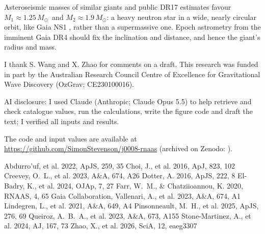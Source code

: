 \documentclass{aastex701}
\newcommand{\msun}{\ensuremath{M_\odot}}
\begin{document}
Asteroseismic masses of similar giants and public DR17 estimates favour $M_1\approx1.25$\,\msun\ and $M_2\approx1.9$\,\msun: a heavy neutron star in a wide, nearly circular orbit, like Gaia NS1 \citep{ElBadry2024}, rather than a supermassive one. Epoch astrometry from the imminent Gaia DR4 should fix the inclination and distance, and hence the giant's radius and mass.

\begin{acknowledgments}
I thank S. Wang and X. Zhao for comments on a draft. This research was funded in part by the Australian Research Council Centre of Excellence for Gravitational Wave Discovery (OzGrav; CE230100016).
\end{acknowledgments}

\begin{contribution}
AI disclosure: I used Claude (Anthropic; Claude Opus 5.5) to help retrieve and check catalogue values, run the calculations, write the figure code and draft the text; I verified all inputs and results.
\end{contribution}

The code and input values are available at \url{https://github.com/SimonStevenson/j0008-rnaas} (archived on Zenodo: ).



\begin{thebibliography}{}
 Abdurro'uf, et al. 2022, ApJS, 259, 35
 Choi, J., et al. 2016, ApJ, 823, 102
 Creevey, O.~L., et al. 2023, A\&A, 674, A26
 Dotter, A. 2016, ApJS, 222, 8
 El-Badry, K., et al. 2024, OJAp, 7, 27
 Farr, W.~M., \& Chatziioannou, K. 2020, RNAAS, 4, 65
 Gaia Collaboration, Vallenari, A., et al. 2023, A\&A, 674, A1
 Lindegren, L., et al. 2021, A\&A, 649, A4
 Pinsonneault, M.~H., et al. 2025, ApJS, 276, 69
 Queiroz, A.~B.~A., et al. 2023, A\&A, 673, A155
 Stone-Martinez, A., et al. 2024, AJ, 167, 73
 Zhao, X., et al. 2026, SciA, 12, eaeg3307
\end{thebibliography}
\end{document}
